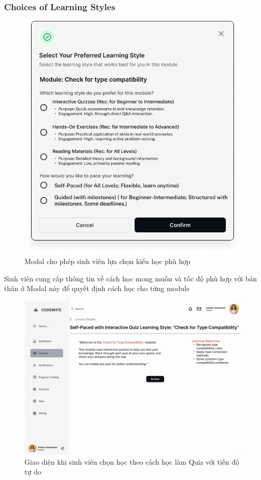 \subsubsection{Choices of Learning Styles}
\begin{figure}[H]
    \centering
    \includegraphics[scale=0.3]{Images/figmaDesign/Get Learning Style Modal.png}
    \caption{Modal cho phép sinh viên lựa chọn kiểu học phù hợp}
    \label{fig:enter-label}
\end{figure}
Sinh viên cung cấp thông tin về cách học mong muốn và tốc độ phù hợp với bản thân ở Modal này để quyết định cách học cho từng module
\begin{figure}[H]
    \centering
    \includegraphics[scale=0.3]{Images/figmaDesign/Detailed Lesson Page - Self Pace Quiz.png}
    \caption{Giao diện khi sinh viên chọn học theo cách học làm Quiz với tiến độ tự do}
    \label{fig:enter-label}
\end{figure}
